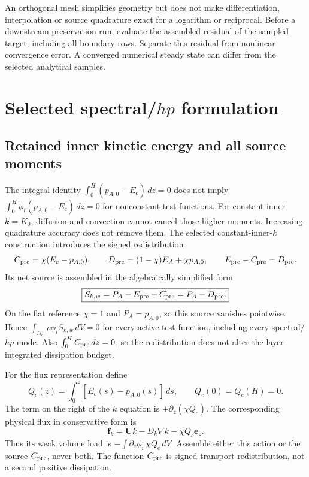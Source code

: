 \documentclass[11pt,a4paper]{article}
\numberwithin{equation}{section}
\begin{document}
An orthogonal mesh simplifies geometry but does not make differentiation,
interpolation or source quadrature exact for a logarithm or reciprocal.
Before a downstream-preservation run, evaluate the assembled residual of
the sampled target, including all boundary rows. Separate this residual
from nonlinear convergence error. A converged numerical steady state
can differ from the selected analytical samples.


\section{Selected spectral/\texorpdfstring{$hp$}{hp} formulation}
\label{sec:wj-wall-moments}

\subsection{Retained inner kinetic energy and all source moments}
The integral identity
$\int_0^H(p_{A,0}-E_c)\,dz=0$ does not imply
$\int_0^H\phi_i(p_{A,0}-E_c)\,dz=0$ for nonconstant test functions.
For constant inner $k=K_0$, diffusion and convection cannot cancel those
higher moments. Increasing quadrature accuracy does not remove them.
The selected constant-inner-$k$ construction introduces the signed
redistribution
\begin{equation}
 C_{\rm pre}=\chi(E_c-p_{A,0}),\qquad
 D_{\rm pre}=(1-\chi)E_A+\chi p_{A,0},
 \qquad E_{\rm pre}-C_{\rm pre}=D_{\rm pre}.
 \label{eq:wj-wall-redistribution}
\end{equation}
Its net source is assembled in the algebraically simplified form
\begin{equation}
 \boxed{S_{k,w}=P_A-E_{\rm pre}+C_{\rm pre}=P_A-D_{\rm pre}.}
 \label{eq:wj-wall-source}
\end{equation}
On the flat reference $\chi=1$ and $P_A=p_{A,0}$, so this source
vanishes pointwise. Hence
$\int_{\Omega_w}\rho\phi_iS_{k,w}\,dV=0$ for every active test
function, including every spectral/$hp$ mode. Also
$\int_0^HC_{\rm pre}\,dz=0$, so the redistribution does not alter
the layer-integrated dissipation budget.

For the flux representation define
\begin{equation}
 Q_c(z)=\int_0^z[E_c(s)-p_{A,0}(s)]\,ds,
 \qquad Q_c(0)=Q_c(H)=0.
 \label{eq:wj-wall-Q}
\end{equation}
The term on the right of the $k$ equation is $+\partial_z(\chi Q_c)$.
The corresponding physical flux in conservative form is
\begin{equation}
 \boxed{\bm f_k=\bm U k-D_k\nabla k-\chi Q_c\bm e_z.}
 \label{eq:wj-wall-Q-sign}
\end{equation}
Thus its weak volume load is
$-\int\partial_z\phi_i\,\chi Q_c\,dV$. Assemble either this action
or the source $C_{\rm pre}$, never both. The function $C_{\rm pre}$
is signed transport redistribution, not a second positive dissipation.
\end{document}

